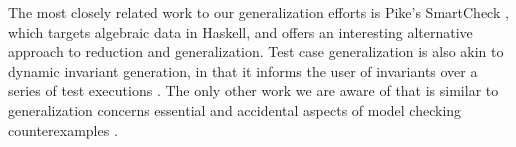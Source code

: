 The most closely related work to our generalization efforts is Pike's
SmartCheck \cite{SmartCheck}, which targets algebraic data in
Haskell, and offers an interesting alternative approach to reduction
and generalization.  Test case generalization is also akin to dynamic invariant generation,
in that it informs the user of invariants over a series of test
executions \cite{Daikon}.  The only other work we are aware of that is
similar to generalization concerns essential and accidental aspects of
model checking counterexamples \cite{FreeWill,MakeMost,SPIN03}.  